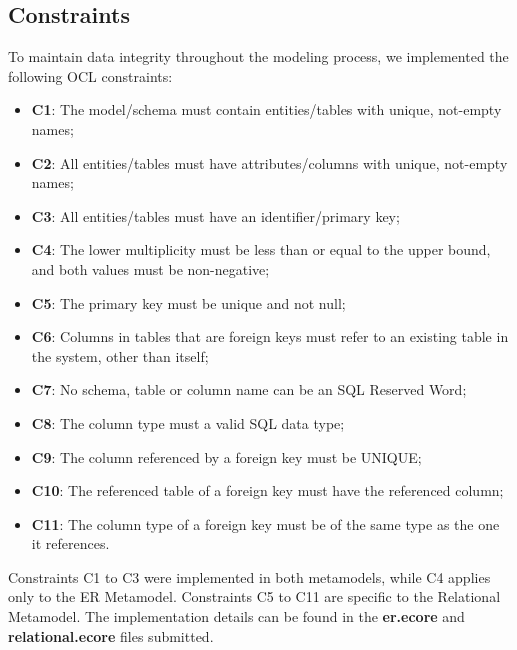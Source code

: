 \documentclass[10pt]{article}
\begin{document}
\subsection{Constraints}

To maintain data integrity throughout the modeling process, we implemented the following OCL constraints:

\begin{itemize}

    \item \textbf{C1}: The model/schema must contain entities/tables with unique, not-empty names;

    \item \textbf{C2}: All entities/tables must have attributes/columns with unique, not-empty names;
    
    \item \textbf{C3}: All entities/tables must have an identifier/primary key;
    
    \item \textbf{C4}: The lower multiplicity must be less than or equal to the upper bound, and both values must be non-negative;
    
    \item \textbf{C5}: The primary key must be unique and not null;
    
    \item \textbf{C6}: Columns in tables that are foreign keys must refer to an existing table in the system, other than itself;

    \item \textbf{C7}: No schema, table or column name can be an SQL Reserved Word;

    \item \textbf{C8}: The column type must a valid SQL data type;

    \item \textbf{C9}: The column referenced by a foreign key must be UNIQUE;

    \item \textbf{C10}: The referenced table of a foreign key must have the referenced column;

    \item \textbf{C11}: The column type of a foreign key must be of the same type as the one it references.

\end{itemize}

Constraints C1 to C3 were implemented in both metamodels, while C4 applies only to the ER Metamodel. Constraints C5 to C11 are specific to the Relational Metamodel. The implementation details can be found in the \textbf{er.ecore} and \textbf{relational.ecore} files submitted.
\end{document}
